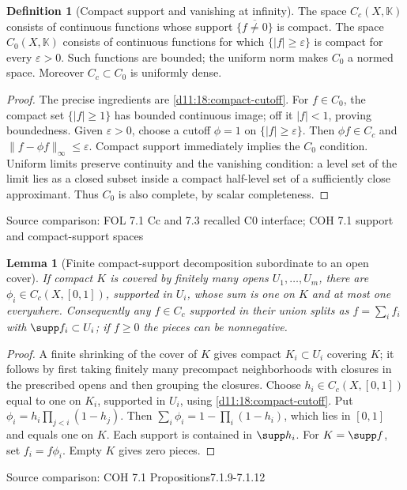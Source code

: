\documentclass[11pt,oneside,openany]{book}
\newtheorem{lemma}[theorem]{Lemma}
\theoremstyle{definition}
\newtheorem{definition}[theorem]{Definition}
\theoremstyle{remark}
\newcommand{\eps}{\varepsilon}\newcommand{\ee}{\varepsilon}
\newcommand{\family}[1]{}
\newcommand{\source}[1]{\par\begingroup\small\sffamily\color{black!65}Source comparison: #1\par\endgroup}
\begin{document}
\begin{definition}[Compact support and vanishing at infinity]\family{D11.19.cc_czero}\label{d11:19:cc-czero}
The space $C_c(X,\mathbb K)$ consists of continuous functions whose support $\overline{\{f\ne0\}}$ is compact. The space $C_0(X,\mathbb K)$ consists of continuous functions for which $\{|f|\ge\eps\}$ is compact for every $\eps>0$. Such functions are bounded; the uniform norm makes $C_0$ a normed space. Moreover $C_c\subset C_0$ is uniformly dense.
\end{definition}
\begin{proof}
The precise ingredients are \cref{d11:18:compact-cutoff}. For $f\in C_0$, the compact set $\{|f|\ge1\}$ has bounded continuous image; off it $|f|<1$, proving boundedness. Given $\eps>0$, choose a cutoff $\phi=1$ on $\{|f|\ge\eps\}$. Then $\phi f\in C_c$ and $\|f-\phi f\|_\infty\le\eps$. Compact support immediately implies the $C_0$ condition. Uniform limits preserve continuity and the vanishing condition: a level set of the limit lies as a closed subset inside a compact half-level set of a sufficiently close approximant. Thus $C_0$ is also complete, by scalar completeness.
\end{proof}
\source{FOL 7.1 Cc and 7.3 recalled C0 interface; COH 7.1 support and compact-support spaces}

\begin{lemma}[Finite compact-support decomposition subordinate to an open cover]\family{D11.19.finite_compact_partition}\label{d11:19:finite-compact-partition}
If compact $K$ is covered by finitely many opens $U_1,\ldots,U_m$, there are $\phi_i\in C_c(X,[0,1])$, supported in $U_i$, whose sum is one on $K$ and at most one everywhere. Consequently any $f\in C_c$ supported in their union splits as $f=\sum_i f_i$ with $\supp f_i\subset U_i$; if $f\ge0$ the pieces can be nonnegative.
\end{lemma}
\begin{proof}
A finite shrinking of the cover of $K$ gives compact $K_i\subset U_i$ covering $K$; it follows by first taking finitely many precompact neighborhoods with closures in the prescribed opens and then grouping the closures. Choose $h_i\in C_c(X,[0,1])$ equal to one on $K_i$, supported in $U_i$, using \cref{d11:18:compact-cutoff}. Put $\phi_i=h_i\prod_{j<i}(1-h_j)$. Then $\sum_i\phi_i=1-\prod_i(1-h_i)$, which lies in $[0,1]$ and equals one on $K$. Each support is contained in $\supp h_i$. For $K=\supp f$, set $f_i=f\phi_i$. Empty $K$ gives zero pieces.
\end{proof}
\source{COH 7.1 Propositions7.1.9-7.1.12}
\end{document}
